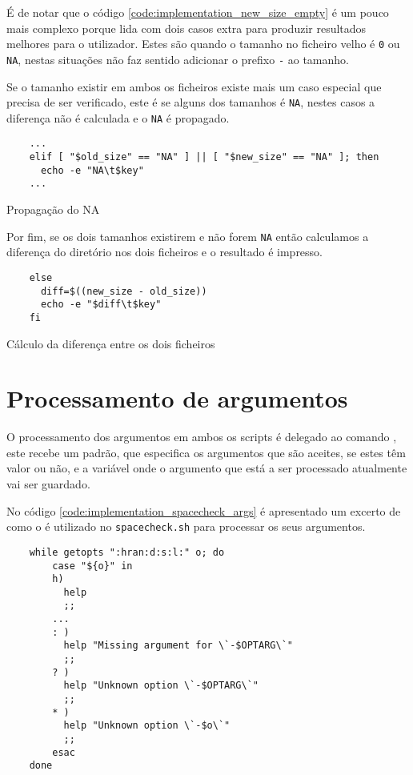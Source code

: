 É de notar que o código \ref{code:implementation_new_size_empty} é um pouco mais
complexo porque lida com dois casos extra para produzir resultados melhores para
o utilizador. Estes são quando o tamanho no ficheiro velho é \Verb|0| ou
\Verb|NA|, nestas situações não faz sentido adicionar o prefixo \Verb|-| ao
tamanho.

Se o tamanho existir em ambos os ficheiros existe mais um caso especial que
precisa de ser verificado, este é se alguns dos tamanhos é \Verb|NA|, nestes
casos a diferença não é calculada e o \Verb|NA| é propagado.

\begin{listing}[H]
	\centering
	\begin{verbatim}
    ...
    elif [ "$old_size" == "NA" ] || [ "$new_size" == "NA" ]; then
      echo -e "NA\t$key"
    ...
  \end{verbatim}
	\caption{Propagação do NA}
\end{listing}

Por fim, se os dois tamanhos existirem e não forem \Verb|NA| então calculamos a
diferença do diretório nos dois ficheiros e o resultado é impresso.

\begin{listing}[H]
	\centering
	\begin{verbatim}
    else
      diff=$((new_size - old_size))
      echo -e "$diff\t$key"
    fi
  \end{verbatim}
	\caption{Cálculo da diferença entre os dois ficheiros}
\end{listing}

\section{Processamento de argumentos}\label{sec:implementation_arg_parsing}

O processamento dos argumentos em ambos os scripts é delegado ao comando
, este recebe um padrão, que especifica os argumentos que são
aceites, se estes têm valor ou não, e a variável onde o argumento que está a ser
processado atualmente vai ser guardado.

No código \ref{code:implementation_spacecheck_args} é apresentado um excerto de
como o  é utilizado no \Verb|spacecheck.sh| para processar
os seus argumentos.

\begin{listing}[H]
	\centering
	\begin{verbatim}
    while getopts ":hran:d:s:l:" o; do
        case "${o}" in
        h)
          help
          ;;
        ...
        : )
          help "Missing argument for \`-$OPTARG\`"
          ;;
        ? )
          help "Unknown option \`-$OPTARG\`"
          ;;
        * )
          help "Unknown option \`-$o\`"
          ;;
        esac
    done
  \end{verbatim}
	\cprotect\caption{Processamento de argumentos no \Verb|spacecheck.sh|}
	\label{code:implementation_spacecheck_args}
\end{listing}

